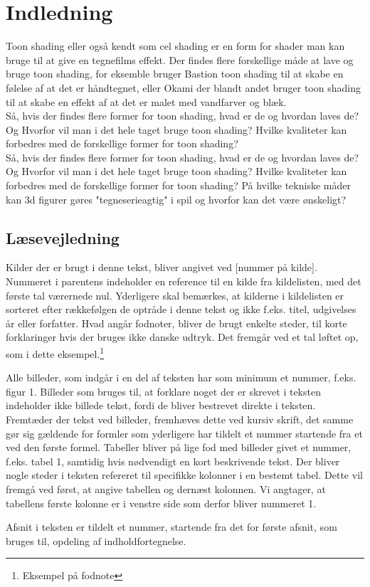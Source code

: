 \section*{Indledning}
\thispagestyle{empty}
Toon shading eller også kendt som cel shading er en form for shader man kan bruge til at give en tegnefilms effekt. Der findes flere forskellige måde at lave og bruge toon shading, for eksemble bruger Bastion toon shading til at skabe en følelse af at det er håndtegnet, eller Okami der blandt andet bruger toon shading til at skabe en effekt af at det er malet med vandfarver og blæk.
\\
Så, hvis der findes flere former for toon shading, hvad er de og hvordan laves de? Og Hvorfor vil man i det hele taget bruge toon shading? Hvilke kvaliteter kan forbedres med de forskellige former for toon shading?
\\
Så, hvis der findes flere former for toon shading, hvad er de og hvordan laves de? Og Hvorfor vil man i det hele taget bruge toon shading? Hvilke kvaliteter kan forbedres med de forskellige former for toon shading?
På hvilke tekniske måder kan 3d figurer gøres "tegneserieagtig"
i spil og hvorfor kan det være ønskeligt?

\subsection*{Læsevejledning}
Kilder der er brugt i denne tekst, bliver angivet ved [nummer på kilde]. 
Nummeret i parentens indeholder en reference til en kilde fra kildelisten, med det første tal værernede nul. 
Yderligere skal bemærkes, at kilderne i kildelisten er sorteret efter rækkefølgen de optråde i denne tekst og ikke f.eks. titel, udgivelses år eller forfatter. 
Hvad angår fodnoter, bliver de brugt enkelte steder, til korte forklaringer hvis der bruges ikke danske udtryk. Det fremgår ved et tal løftet op, som i dette eksempel.\footnote[1]{Eksempel på fodnote}  

Alle billeder, som indgår i en del af teksten har som minimum et nummer, f.eks. figur 1. Billeder som bruges til, at forklare noget der er skrevet i teksten indeholder ikke
billede tekst, fordi de bliver bestrevet direkte i teksten. Fremtæder der tekst ved billeder, fremhæves dette ved kursiv skrift, det samme gør sig gældende for formler som
yderligere har tildelt et nummer startende fra et ved den første formel. Tabeller bliver på lige fod med billeder givet et nummer, f.eks. tabel 1, samtidig hvis nødvendigt en kort beskrivende tekst. Der bliver nogle steder i teksten refereret til specifikke kolonner i en bestemt tabel. Dette vil fremgå ved først, at angive tabellen og dernæst kolonnen. Vi angtager, at tabellens første kolonne er i venstre side som derfor bliver nummeret 1. 

Afsnit i teksten er tildelt et nummer, startende fra det for første afsnit, som bruges til, opdeling af indholdfortegnelse. 
